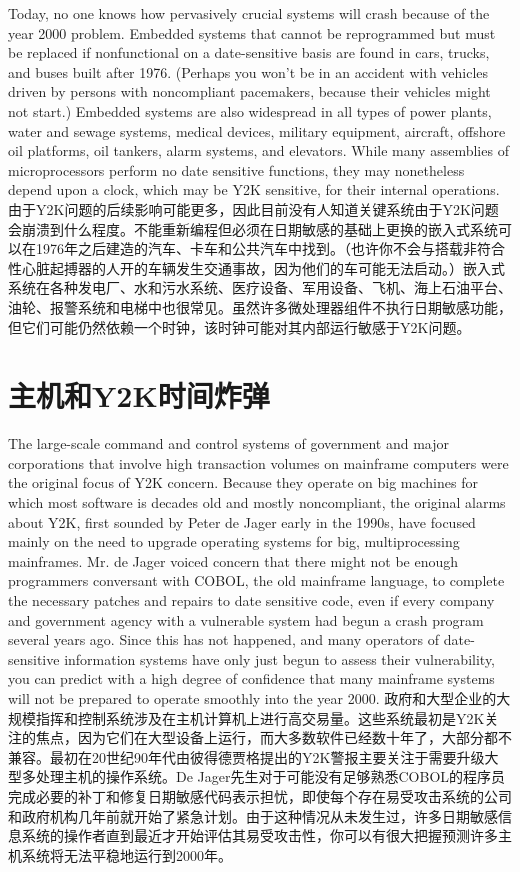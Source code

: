 \begin{Parallel}{97mm}{45mm}
  \ParallelLText
  {Today, no one knows how pervasively crucial systems will crash because of the year 2000 problem. Embedded systems that cannot be reprogrammed but must be replaced if nonfunctional on a date-sensitive basis are found in cars, trucks, and buses built after 1976. (Perhaps you won't be in an accident with vehicles driven by persons with noncompliant pacemakers, because their vehicles might not start.) Embedded systems are also widespread in all types of power plants, water and sewage systems, medical devices, military equipment, aircraft, offshore oil platforms, oil tankers, alarm systems, and elevators. While many assemblies of microprocessors perform no date sensitive functions, they may nonetheless depend upon a clock, which may be Y2K sensitive, for their internal operations.   }  
  \ParallelRText
  {\small 由于Y2K问题的后续影响可能更多，因此目前没有人知道关键系统由于Y2K问题会崩溃到什么程度。不能重新编程但必须在日期敏感的基础上更换的嵌入式系统可以在1976年之后建造的汽车、卡车和公共汽车中找到。（也许你不会与搭载非符合性心脏起搏器的人开的车辆发生交通事故，因为他们的车可能无法启动。）嵌入式系统在各种发电厂、水和污水系统、医疗设备、军用设备、飞机、海上石油平台、油轮、报警系统和电梯中也很常见。虽然许多微处理器组件不执行日期敏感功能，但它们可能仍然依赖一个时钟，该时钟可能对其内部运行敏感于Y2K问题。}
  \ParallelPar

\section{主机和Y2K时间炸弹}

  \ParallelLText
  {The large-scale command and control systems of government and major corporations that involve high transaction volumes on mainframe computers were the original focus of Y2K concern. Because they operate on big machines for which most software is decades old and mostly noncompliant, the original alarms about Y2K, first sounded by Peter de Jager early in the 1990s, have focused mainly on the need to upgrade operating systems for big, multiprocessing mainframes. Mr. de Jager voiced concern that there might not be enough programmers conversant with COBOL, the old mainframe language, to complete the necessary patches and repairs to date sensitive code, even if every company and government agency with a vulnerable system had begun a crash program several years ago. Since this has not happened, and many operators of date-sensitive information systems have only just begun to assess their vulnerability, you can predict with a high degree of confidence that many mainframe systems will not be prepared to operate smoothly into the year 2000.}  
  \ParallelRText
  {\small 政府和大型企业的大规模指挥和控制系统涉及在主机计算机上进行高交易量。这些系统最初是Y2K关注的焦点，因为它们在大型设备上运行，而大多数软件已经数十年了，大部分都不兼容。最初在20世纪90年代由彼得德贾格提出的Y2K警报主要关注于需要升级大型多处理主机的操作系统。De Jager先生对于可能没有足够熟悉COBOL的程序员完成必要的补丁和修复日期敏感代码表示担忧，即使每个存在易受攻击系统的公司和政府机构几年前就开始了紧急计划。由于这种情况从未发生过，许多日期敏感信息系统的操作者直到最近才开始评估其易受攻击性，你可以有很大把握预测许多主机系统将无法平稳地运行到2000年。}
  \ParallelPar



\end{Parallel}
